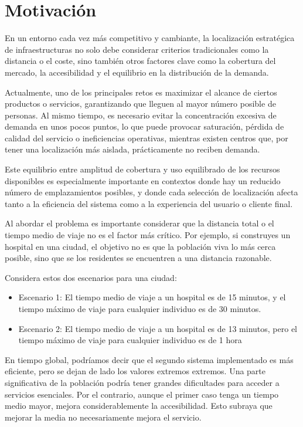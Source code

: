 \documentclass[12pt,a4paper]{book}
\begin{document}
\section{Motivación}
En un entorno cada vez más competitivo y cambiante, la localización estratégica de infraestructuras no solo debe considerar criterios tradicionales como la distancia o el coste, sino también otros factores clave como la cobertura del mercado, la accesibilidad y el equilibrio en la distribución de la demanda.

Actualmente, uno de los principales retos es maximizar el alcance de ciertos productos o servicios, garantizando que lleguen al mayor número posible de personas. Al mismo tiempo, es necesario evitar la concentración excesiva de demanda en unos pocos puntos, lo que puede provocar saturación, pérdida de calidad del servicio o ineficiencias operativas, mientras existen centros que, por tener una localización más aislada, prácticamente no reciben demanda.

Este equilibrio entre amplitud de cobertura y uso equilibrado de los recursos disponibles es especialmente importante en contextos donde hay un reducido número de emplazamientos posibles, y donde cada selección de localización afecta tanto a la eficiencia del sistema como a la experiencia del usuario o cliente final.

Al abordar el problema es importante considerar que la distancia total o el tiempo medio de viaje no es el factor más crítico. Por ejemplo, si construyes un hospital en una ciudad, el objetivo no es que la población viva lo más cerca posible, sino que se
los residentes se encuentren a una distancia razonable. 

Considera estos dos escenarios para una ciudad:
\begin{itemize}
    \item Escenario 1: El tiempo medio de viaje a un hospital es de 15 minutos, y el tiempo máximo de viaje para cualquier individuo es de 30 minutos.
    \item Escenario 2: El tiempo medio de viaje a un hospital es de 13 minutos, pero el tiempo máximo de viaje para cualquier individuo es de 1 hora
\end{itemize} 
En tiempo global, podríamos decir que el segundo sistema implementado es más eficiente, pero se dejan de lado los valores extremos extremos. Una parte significativa de la población podría tener grandes dificultades para acceder a servicios esenciales. Por el contrario, aunque el primer caso tenga un tiempo medio mayor, mejora considerablemente la accesibilidad. Esto subraya que mejorar la media no necesariamente mejora el servicio.
\end{document}

